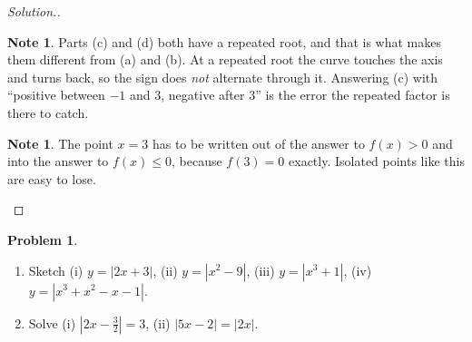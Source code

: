\documentclass[11pt,a4paper]{article}
\theoremstyle{definition}
\newtheorem{note}[thm]{Note}
\newtheorem{problemx}{Problem}[section]
\newenvironment{problem}{\begin{problemx}}{\end{problemx}}
\newenvironment{solution}
  {\renewcommand{\qedsymbol}{}\begin{proof}[\textit{Solution}.]}
  {\end{proof}}
\begin{document}
\begin{solution}
\begin{note}
Parts (c) and (d) both have a repeated root, and that is what makes them different from
(a) and (b). At a repeated root the curve touches the axis and turns back, so the sign
does \emph{not} alternate through it. Answering (c) with ``positive between $-1$ and
$3$, negative after $3$'' is the error the repeated factor is there to catch.
\end{note}

\begin{note}
The point $x=3$ has to be written out of the answer to $f(x)>0$ and into the answer to
$f(x)\leq 0$, because $f(3)=0$ exactly. Isolated points like this are easy to lose.
\end{note}
\end{solution}

\begin{problem}
\begin{enumerate}
\item[(a).] Sketch \quad (i) $y=|2x+3|$, \quad (ii) $y=\left|x^2-9\right|$, \quad
(iii) $y=\left|x^3+1\right|$, \quad (iv) $y=\left|x^3+x^2-x-1\right|$.
\item[(b).] Solve \quad (i) $\left|2x-\frac{3}{2}\right|=3$, \quad
(ii) $|5x-2|=|2x|$.
\end{enumerate}
\end{problem}
\end{document}
